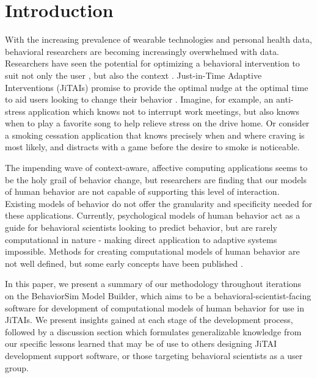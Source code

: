 \documentclass{sigchi}
\begin{document}

 

\section{Introduction}
With the increasing prevalence of wearable technologies and personal health data, behavioral researchers are becoming increasingly overwhelmed with data.
Researchers have seen the potential for optimizing a behavioral intervention to suit not only the user \cite{dallery2014optimizing, beck2010challenges}, but also the context \cite{brailsford2010towards, collins2004}. 
Just-in-Time Adaptive Interventions (JiTAIs) promise to provide the optimal nudge at the optimal time to aid users looking to change their behavior \cite{nahum2014}.
Imagine, for example, an anti-stress application which knows not to interrupt work meetings, but also knows when to play a favorite song to help relieve stress on the drive home.
Or consider a smoking cessation application that knows precisely when and where craving is most likely, and distracts with a game before the desire to smoke is noticeable.

The impending wave of context-aware\cite{schilit1994context}, affective computing\cite{picard2000affective} applications seems to be the holy grail of behavior change, but researchers are finding that our models of human behavior are not capable of supporting this level of interaction.
Existing  models of behavior do not offer the granularity and specificity needed for these applications\cite{riley2011health}.
Currently, psychological models of human behavior act as a guide for behavioral scientists looking to predict behavior, but are rarely computational in nature - making direct application to adaptive systems impossible.
Methods for creating computational models of human behavior are not well defined, but some early concepts have been published \cite{rivera2013systems}.

In this paper, we present a summary of our methodology throughout iterations on the BehaviorSim Model Builder, which aims to be a behavioral-scientist-facing software for development of computational models of human behavior for use in JiTAIs.
We present insights gained at each stage of the development process, followed by a discussion section which formulates generalizable knowledge from our specific lessons learned that may be of use to others designing JiTAI development support software, or those targeting behavioral scientists as a user group.
\end{document}
